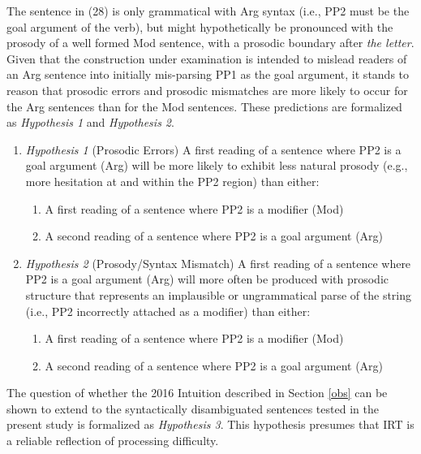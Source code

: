 \documentclass[11pt,oneside]{book}
\providecommand{\tightlist}{%
  \setlength{\itemsep}{0pt}\setlength{\parskip}{0pt}}
\begin{document}
\doublespacing

The sentence in (28) is only grammatical with Arg syntax (i.e., PP2 must be the goal argument of the verb), but might hypothetically be pronounced with the prosody of a well formed Mod sentence, with a prosodic boundary after \emph{the letter}. Given that the construction under examination is intended to mislead readers of an Arg sentence into initially mis-parsing PP1 as the goal argument, it stands to reason that prosodic errors and prosodic mismatches are more likely to occur for the Arg sentences than for the Mod sentences. These predictions are formalized as \emph{Hypothesis 1} and \emph{Hypothesis 2}.

\begin{enumerate}
\def\labelenumi{(\arabic{enumi})}
\setcounter{enumi}{28}
\tightlist
\item
  \emph{Hypothesis 1} (Prosodic Errors)\linebreak\nopagebreak
  A first reading of a sentence where PP2 is a goal argument (Arg) will be more likely to exhibit less natural prosody (e.g., more hesitation at and within the PP2 region) than either:

  \begin{enumerate}
  \def\labelenumii{\alph{enumii}.}
  \tightlist
  \item
    A first reading of a sentence where PP2 is a modifier (Mod)
  \item
    A second reading of a sentence where PP2 is a goal argument (Arg)
  \end{enumerate}
\item
  \emph{Hypothesis 2} (Prosody/Syntax Mismatch)\linebreak\nopagebreak
  A first reading of a sentence where PP2 is a goal argument (Arg) will more often be produced with prosodic structure that represents an implausible or ungrammatical parse of the string (i.e., PP2 incorrectly attached as a modifier) than either:

  \begin{enumerate}
  \def\labelenumii{\alph{enumii}.}
  \tightlist
  \item
    A first reading of a sentence where PP2 is a modifier (Mod)
  \item
    A second reading of a sentence where PP2 is a goal argument (Arg)
  \end{enumerate}
\end{enumerate}

The question of whether the 2016 Intuition described in Section \ref{obs} can be shown to extend to the syntactically disambiguated sentences tested in the present study is formalized as \emph{Hypothesis 3}. This hypothesis presumes that IRT is a reliable reflection of processing difficulty.
\end{document}
